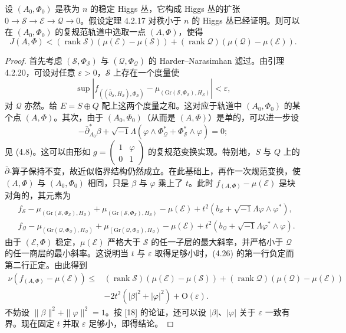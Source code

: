 \begin{lemma}
设 $(A_0,\Phi_0)$ 是秩为 $n$ 的稳定 Higgs 丛，它构成 Higgs 丛的扩张
$0\to\mathcal{S}\to\mathcal{E}\to\mathcal{Q}\to0$。假设定理 4.2.17 对秩小于 $n$ 的 Higgs 丛已经证明。则可以在 $(A_0,\Phi_0)$ 的复规范轨道中选取一点 $(A,\Phi)$，使得
\[
J(A,\Phi)<(\operatorname{rank}\mathcal{S})(\mu(\mathcal{E})-\mu(\mathcal{S}))+(\operatorname{rank}\mathcal{Q})(\mu(\mathcal{Q})-\mu(\mathcal{E})).
\]
\end{lemma}

\begin{proof}
首先考虑 $(\mathcal{S},\Phi_{\mathcal{S}})$ 与 $(\mathcal{Q},\Phi_{\mathcal{Q}})$ 的 Harder–Narasimhan 滤过。由引理 4.2.20，可设对任意 $\varepsilon>0$，$\mathcal{S}$ 上存在一个度量使
\[
\sup\left|f_{((\bar\partial_{\mathcal{S}},H_{\mathcal{S}}),\Phi_{\mathcal{S}})}-\mu_{(\mathrm{Gr}(\mathcal{S},\Phi_{\mathcal{S}}),H_{\mathcal{S}})}\right|<\varepsilon,
\]
对 $\mathcal{Q}$ 亦然。给 $E=S\oplus Q$ 配上这两个度量之和。这对应于轨道中 $(A_0,\Phi_0)$ 的某个点 $(A,\Phi)$。其次，由于 $(A_0,\Phi_0)$（从而是 $(A,\Phi)$）是单的，可以进一步设
\[
-\bar\partial^*_{A_0}\beta+\sqrt{-1}\Lambda\left(\varphi\wedge\Phi^*_{\mathcal{Q}}+\Phi^*_{\mathcal{S}}\wedge\varphi\right)=0;
\]
见 (4.8)。这可以由形如 $g=\begin{pmatrix}1&\varphi\\0&1\end{pmatrix}$ 的复规范变换实现。特别地，$S$ 与 $Q$ 上的 $\bar\partial$-算子保持不变，故近似临界结构仍然成立。在此基础上，再作一次规范变换，使 $(A,\Phi)$ 与 $(A_0,\Phi_0)$ 相同，只是 $\beta$ 与 $\varphi$ 乘上了 $t$。此时 $f_{(A,\Phi)}-\mu(\mathcal{E})$ 是块对角的，其元素为
\begin{equation}
\begin{aligned}
&f_{\mathcal{S}}-\mu_{(\mathrm{Gr}(\mathcal{S},\Phi_{\mathcal{S}}),H_{\mathcal{S}})}+\mu_{(\mathrm{Gr}(\mathcal{S},\Phi_{\mathcal{S}}),H_{\mathcal{S}})}-\mu(\mathcal{E})+t^2\left(b_{\mathcal{S}}+\sqrt{-1}\Lambda\varphi\wedge\varphi^*\right),\\
&f_{\mathcal{Q}}-\mu_{(\mathrm{Gr}(\mathcal{Q},\Phi_{\mathcal{Q}}),H_{\mathcal{Q}})}+\mu_{(\mathrm{Gr}(\mathcal{Q},\Phi_{\mathcal{Q}}),H_{\mathcal{Q}})}-\mu(\mathcal{E})+t^2\left(b_{\mathcal{Q}}+\sqrt{-1}\Lambda\varphi^*\wedge\varphi\right).
\end{aligned}
\label{eq:4.26}
\tag{4.26}
\end{equation}
由于 $(\mathcal{E},\Phi)$ 稳定，$\mu(\mathcal{E})$ 严格大于 $\mathcal{S}$ 的任一子层的最大斜率，并严格小于 $\mathcal{Q}$ 的任一商层的最小斜率。这说明当 $t$ 与 $\varepsilon$ 取得足够小时，(4.26) 的第一行负定而第二行正定。由此得到
\[
\begin{aligned}
\nu(f_{(A,\Phi)}-\mu(\mathcal{E}))\le{}&(\operatorname{rank}\mathcal{S})(\mu(\mathcal{E})-\mu(\mathcal{S}))+(\operatorname{rank}\mathcal{Q})(\mu(\mathcal{Q})-\mu(\mathcal{E}))\\
&-2t^2\left(|\beta|^2+|\varphi|^2\right)+\mathrm{O}(\varepsilon).
\end{aligned}
\]
不妨设 $\|\beta\|^2+\|\varphi\|^2=1$。按 [18] 的论证，还可以设 $|\beta|$、$|\varphi|$ 关于 $\varepsilon$ 一致有界。现在固定 $t$ 并取 $\varepsilon$ 足够小，即得结论。
\end{proof}

